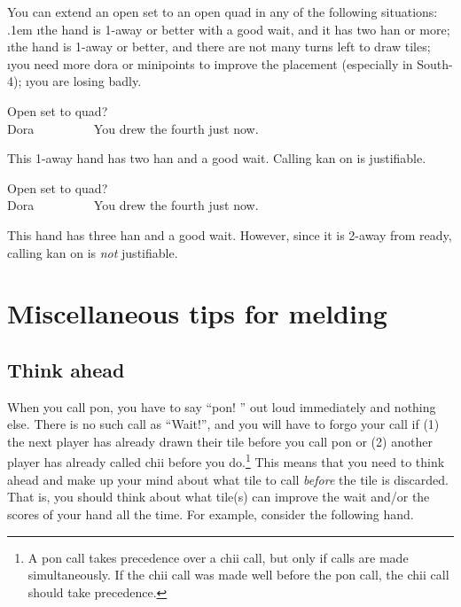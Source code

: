 \bigskip
You can extend an open set to an open quad in any of the following situations:
\bi \itemsep.1em
\i the hand is 1-away or better with a good wait, and it has two {\jap han} or more;
\i the hand is 1-away or better, and there are not many turns left to draw tiles;
\i you need more {\jap dora} or minipoints to improve the placement (especially in South-4);
\i you are losing badly.
\ei

\bigskip
\begin{itembox}[r]{Open set to quad?}
\bp
{}~\zhong\rzhong\zhong~\\
\hfill\footnotesize{{\jap Dora}~~~~~~~~~}
\ep
\vspace{-20pt}You drew the fourth {\LARGE\zhong} just now.
\end{itembox}
\noindent This 1-away hand has two {\jap han} and a good wait. Calling {\jap kan} on {\LARGE\zhong} is justifiable. 

\bigskip
\begin{itembox}[r]{Open set to quad?}
\bp
{}~\zhong\rzhong\zhong~\\
\hfill\footnotesize{{\jap Dora}~~~~~~~~~}
\ep
\vspace{-20pt}You drew the fourth {\LARGE\zhong} just now.
\end{itembox}
\noindent This hand has three {\jap han} and a good wait. However, since it is 2-away from ready, calling {\jap kan} on {\LARGE\zhong} is \emph{not} justifiable. 

\newpage
\section{Miscellaneous tips for melding}

\subsection{Think ahead}

When you call {\jap pon}, you have to say ``{\jap pon}! \textipa{[p\'\textopeno\ng]}'' out loud immediately and nothing else. There is no such call as ``Wait!'',  and you will have to forgo your call if (1) the next player has already drawn their tile before you call {\jap pon} or (2) another player has already called {\jap chii} before you do.\footnote{A {\jap pon} call takes precedence over a {\jap chii} call, but only if calls are made simultaneously. If the {\jap chii} call was made well before the {\jap pon} call, the {\jap chii} call should take precedence.}
This means that you need to think ahead and make up your mind about what tile to call \emph{before} the tile is discarded. That is, you should think about what tile(s) can improve the wait and/or the scores of your hand all the time. For example, consider the following hand. 

